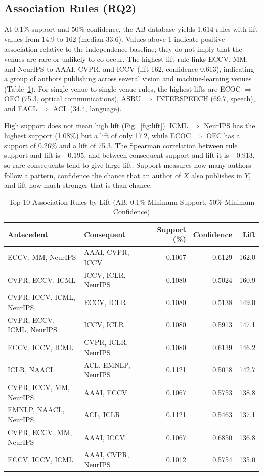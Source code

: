 \documentclass[conference]{IEEEtran}
\begin{document}
\subsection{Association Rules (RQ2)}
At 0.1\% support and 50\% confidence, the AB database yields 1,614 rules with lift values from 14.9 to 162 (median 33.6). Values above 1 indicate positive association relative to the independence baseline; they do not imply that the venues are rare or unlikely to co-occur. The highest-lift rule links ECCV, MM, and NeurIPS to AAAI, CVPR, and ICCV (lift 162, confidence 0.613), indicating a group of authors publishing across several vision and machine-learning venues (Table~\ref{tab:rules}). For single-venue-to-single-venue rules, the highest lifts are ECOC $\Rightarrow$ OFC (75.3, optical communications), ASRU $\Rightarrow$ INTERSPEECH (69.7, speech), and EACL $\Rightarrow$ ACL (34.4, language).

High support does not mean high lift (Fig.~\ref{fig:lift}). ICML $\Rightarrow$ NeurIPS has the highest support (1.08\%) but a lift of only 17.2, while ECOC $\Rightarrow$ OFC has a support of 0.26\% and a lift of 75.3. The Spearman correlation between rule support and lift is $-0.195$, and between consequent support and lift it is $-0.913$, so rare consequents tend to give large lift. Support measures how many authors follow a pattern, confidence the chance that an author of $X$ also publishes in $Y$, and lift how much stronger that is than chance.

\begin{table}[t]
\caption{Top-10 Association Rules by Lift (AB, 0.1\% Minimum Support, 50\% Minimum Confidence)}
\label{tab:rules}
\centering
\scriptsize
\setlength{\tabcolsep}{3pt}
\begin{tabular}{p{3.15cm}p{3.15cm}rrr}
\toprule
Antecedent & Consequent & Support (\%) & Confidence & Lift \\
\midrule
ECCV, MM, NeurIPS & AAAI, CVPR, ICCV & 0.1067 & 0.6129 & 162.0 \\
CVPR, ECCV, ICML & ICCV, ICLR, NeurIPS & 0.1080 & 0.5024 & 160.9 \\
CVPR, ICCV, ICML, NeurIPS & ECCV, ICLR & 0.1080 & 0.5138 & 149.0 \\
CVPR, ECCV, ICML, NeurIPS & ICCV, ICLR & 0.1080 & 0.5913 & 147.1 \\
ECCV, ICCV, ICML & CVPR, ICLR, NeurIPS & 0.1080 & 0.6139 & 146.2 \\
ICLR, NAACL & ACL, EMNLP, NeurIPS & 0.1121 & 0.5018 & 142.7 \\
CVPR, ICCV, MM, NeurIPS & AAAI, ECCV & 0.1067 & 0.5753 & 138.8 \\
EMNLP, NAACL, NeurIPS & ACL, ICLR & 0.1121 & 0.5463 & 137.1 \\
CVPR, ECCV, MM, NeurIPS & AAAI, ICCV & 0.1067 & 0.6850 & 136.8 \\
ECCV, ICCV, ICML & AAAI, CVPR, NeurIPS & 0.1012 & 0.5754 & 135.0 \\
\bottomrule
\end{tabular}
\end{table}
\end{document}
